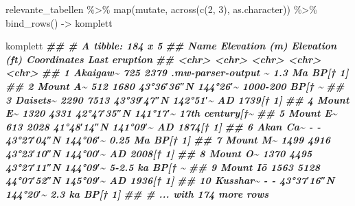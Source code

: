 \documentclass[
  ngerman,
]{article}
\newenvironment{Shaded}{\begin{snugshade}}{\end{snugshade}}
\newcommand{\DecValTok}[1]{\textcolor[rgb]{0.00,0.00,0.81}{#1}}
\newcommand{\DocumentationTok}[1]{\textcolor[rgb]{0.56,0.35,0.01}{\textbf{\textit{#1}}}}
\newcommand{\FunctionTok}[1]{\textcolor[rgb]{0.00,0.00,0.00}{#1}}
\newcommand{\NormalTok}[1]{#1}
\newcommand{\OtherTok}[1]{\textcolor[rgb]{0.56,0.35,0.01}{#1}}
\newcommand{\SpecialCharTok}[1]{\textcolor[rgb]{0.00,0.00,0.00}{#1}}
\begin{document}
\begin{Shaded}
\begin{Highlighting}[]
\NormalTok{relevante\_tabellen }\SpecialCharTok{\%\textgreater{}\%}
  \FunctionTok{map}\NormalTok{(mutate, }\FunctionTok{across}\NormalTok{(}\FunctionTok{c}\NormalTok{(}\DecValTok{2}\NormalTok{, }\DecValTok{3}\NormalTok{), as.character)) }\SpecialCharTok{\%\textgreater{}\%}
  \FunctionTok{bind\_rows}\NormalTok{() }\OtherTok{{-}\textgreater{}}\NormalTok{ komplett}

\NormalTok{komplett}
\DocumentationTok{\#\# \# A tibble: 184 x 5}
\DocumentationTok{\#\#    Name     \textasciigrave{}Elevation (m)\textasciigrave{} \textasciigrave{}Elevation (ft)\textasciigrave{} Coordinates         \textasciigrave{}Last eruption\textasciigrave{}}
\DocumentationTok{\#\#    \textless{}chr\textgreater{}    \textless{}chr\textgreater{}           \textless{}chr\textgreater{}            \textless{}chr\textgreater{}               \textless{}chr\textgreater{}          }
\DocumentationTok{\#\#  1 Akaigaw\textasciitilde{} 725             2379             .mw{-}parser{-}output \textasciitilde{} 1.3 Ma BP[† 1] }
\DocumentationTok{\#\#  2 Mount A\textasciitilde{} 512             1680             43°36′36″N 144°26′\textasciitilde{} 1000{-}200 BP[† \textasciitilde{}}
\DocumentationTok{\#\#  3 Daisets\textasciitilde{} 2290            7513             43°39′47″N 142°51′\textasciitilde{} AD 1739[† 1]   }
\DocumentationTok{\#\#  4 Mount E\textasciitilde{} 1320            4331             42°47′35″N 141°17′\textasciitilde{} 17th century[†\textasciitilde{}}
\DocumentationTok{\#\#  5 Mount E\textasciitilde{} 613             2028             41°48′14″N 141°09′\textasciitilde{} AD 1874[† 1]   }
\DocumentationTok{\#\#  6 Akan Ca\textasciitilde{} {-}               {-}                43°27′04″N 144°06′\textasciitilde{} 0.25 Ma BP[† 1]}
\DocumentationTok{\#\#  7 Mount M\textasciitilde{} 1499            4916             43°23′10″N 144°00′\textasciitilde{} AD 2008[† 1]   }
\DocumentationTok{\#\#  8 Mount O\textasciitilde{} 1370            4495             43°27′11″N 144°09′\textasciitilde{} 5{-}2.5 ka BP[† \textasciitilde{}}
\DocumentationTok{\#\#  9 Mount Iō 1563            5128             44°07′52″N 145°09′\textasciitilde{} AD 1936[† 1]   }
\DocumentationTok{\#\# 10 Kusshar\textasciitilde{} {-}               {-}                43°37′16″N 144°20′\textasciitilde{} 2.3 ka BP[† 1] }
\DocumentationTok{\#\# \# ... with 174 more rows}
\end{Highlighting}
\end{Shaded}
\end{document}
